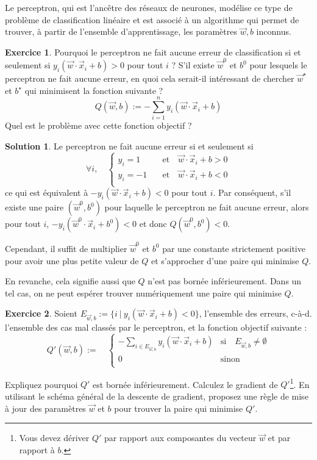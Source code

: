 \documentclass[a4paper,francais]{article}
\theoremstyle{definition}
\newtheorem{exercice}{Exercice}[section]
\newtheorem*{solution}{Solution}
\begin{document}
Le perceptron, qui est l'ancêtre des réseaux de neurones, modélise ce type
de problème de classification linéaire et est associé à un algorithme qui
permet de trouver, à partir de l'ensemble d'apprentissage, les paramètres
$\vec{w},b$ inconnus. 

\begin{exercice}
  Pourquoi le perceptron ne fait aucune erreur de classification
  si et seulement si $y_i (\vec{w}\cdot\vec{x}_i + b) > 0$ pour tout $i$ ?
  S'il existe $\vec{w}^0$ et $b^0$ pour lesquels le perceptron ne fait
  aucune erreur, en quoi cela serait-il intéressant de chercher $\vec{w}^\star$
  et $b^\star$ qui minimisent la fonction suivante ? 
  \[
  Q(\vec{w},b) := - \sum^n_{i=1} y_i (\vec{w}\cdot\vec{x}_i + b)
  \]
  Quel est le problème avec cette fonction objectif ?
\end{exercice}

\begin{solution}
Le perceptron ne fait aucune erreur si et seulement si 
\[
\forall i, \quad
\left\{
\begin{array}{ll}
  y_i = 1 & \quad \mathrm{et}\quad \vec{w}\cdot\vec{x}_i + b > 0 \\
  y_i = -1 & \quad \mathrm{et}\quad \vec{w}\cdot\vec{x}_i + b < 0 \\
\end{array}
\right.
\]
ce qui est équivalent à $- y_i (\vec{w}\cdot\vec{x}_i + b) < 0$ pour tout $i$.
Par conséquent, s'il existe une paire $(\vec{w}^0,b^0)$ pour laquelle
le perceptron ne fait aucune erreur, alors pour tout $i$,
$- y_i (\vec{w}^0\cdot\vec{x}_i + b^0) < 0$ et donc $Q(\vec{w}^0,b^0) < 0$.

Cependant, il suffit de multiplier $\vec{w}^0$ et $b^0$ par une constante
strictement positive pour avoir une plus petite valeur de $Q$ et s'approcher
d'une paire qui minimise $Q$.

En revanche, cela signifie aussi que $Q$ n'est pas bornée inférieurement. 
Dans un tel cas, on ne peut espérer trouver numériquement une paire qui
minimise $Q$.
\end{solution}

\begin{exercice}
  Soient $E_{\vec{w},b} := \{i \ | \ y_i (\vec{w}\cdot\vec{x}_i + b) < 0\}$, l'ensemble des erreurs,
  c-à-d. l'ensemble des cas mal classés par le perceptron, 
  et la fonction objectif suivante :
  \[
  Q'(\vec{w},b) :=
  \quad
  \left\{
  \begin{array}{ll}
    - \sum_{i \in E_{\vec{w},b}} y_i (\vec{w}\cdot\vec{x}_i + b) & \text{si}\quad E_{\vec{w},b} \neq \emptyset \\
    0 & \text{sinon} \\
  \end{array}
  \right.
  \]

  Expliquez pourquoi $Q'$ est bornée inférieurement. 
  Calculez le gradient de $Q'$\footnote{Vous devez dériver $Q'$ par rapport aux
    composantes du vecteur $\vec{w}$ et par rapport à $b$.}.
  En utilisant le schéma général de la descente de gradient,
  proposez une règle de mise à jour des paramètres $\vec{w}$ et $b$
  pour trouver la paire qui minimise $Q'$. 
\end{exercice}
\end{document}
